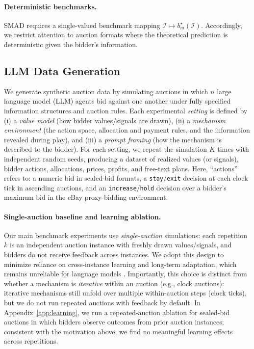 \documentclass{article} %
\begin{document}
\paragraph{Deterministic benchmarks.}
SMAD requires a single-valued benchmark mapping $\mathcal I \mapsto b_m^\star(\mathcal I)$.
Accordingly, we restrict attention to auction formats where the theoretical prediction is deterministic given the bidder’s information.

\subsection{LLM Data Generation}
\label{sec:data_generation}

We generate synthetic auction data by simulating auctions in which $n$ large language model (LLM) agents bid against one another under fully specified information structures and auction rules. Each experimental \emph{setting} is defined by (i) a \emph{value model} (how bidder values/signals are drawn), (ii) a \emph{mechanism environment} (the action space, allocation and payment rules, and the information revealed during play), and (iii) a \emph{prompt framing} (how the mechanism is described to the bidder). For each setting, we repeat the simulation $K$ times with independent random seeds, producing a dataset of realized values (or signals), bidder actions, allocations, prices, profits, and free-text plans. Here, ``actions'' refers to: a numeric bid in sealed-bid formats, a \texttt{stay}/\texttt{exit} decision at each clock tick in ascending auctions, and an \texttt{increase}/\texttt{hold} decision over a bidder's maximum bid in the eBay proxy-bidding environment.

\paragraph{Single-auction baseline and learning ablation.}
Our main benchmark experiments use \emph{single-auction} simulations: each repetition $k$ is an independent auction instance with freshly drawn values/signals, and bidders do not receive feedback across instances. We adopt this design to minimize reliance on cross-instance learning and long-term adaptation, which remains unreliable for language models \citep{dong2024survey}. Importantly, this choice is distinct from whether a mechanism is \emph{iterative} within an auction (e.g., clock auctions): iterative mechanisms still unfold over multiple within-auction steps (clock ticks), but we do not run repeated auctions with feedback by default. In Appendix~\ref{app:learning}, we run a repeated-auction ablation for sealed-bid auctions in which bidders observe outcomes from prior auction instances; consistent with the motivation above, we find no meaningful learning effects across repetitions.
\end{document}
